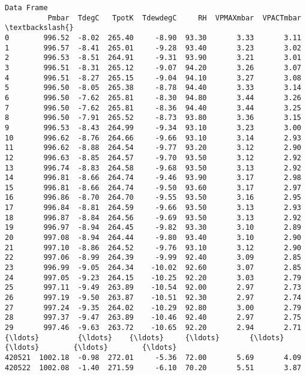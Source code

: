 \documentclass[11pt]{article}
\begin{document}
    \begin{Verbatim}[commandchars=\\\{\}]
Data Frame
          Pmbar  TdegC   TpotK  TdewdegC     RH  VPMAXmbar  VPACTmbar  \textbackslash{}
0        996.52  -8.02  265.40     -8.90  93.30       3.33       3.11   
1        996.57  -8.41  265.01     -9.28  93.40       3.23       3.02   
2        996.53  -8.51  264.91     -9.31  93.90       3.21       3.01   
3        996.51  -8.31  265.12     -9.07  94.20       3.26       3.07   
4        996.51  -8.27  265.15     -9.04  94.10       3.27       3.08   
5        996.50  -8.05  265.38     -8.78  94.40       3.33       3.14   
6        996.50  -7.62  265.81     -8.30  94.80       3.44       3.26   
7        996.50  -7.62  265.81     -8.36  94.40       3.44       3.25   
8        996.50  -7.91  265.52     -8.73  93.80       3.36       3.15   
9        996.53  -8.43  264.99     -9.34  93.10       3.23       3.00   
10       996.62  -8.76  264.66     -9.66  93.10       3.14       2.93   
11       996.62  -8.88  264.54     -9.77  93.20       3.12       2.90   
12       996.63  -8.85  264.57     -9.70  93.50       3.12       2.92   
13       996.74  -8.83  264.58     -9.68  93.50       3.13       2.92   
14       996.81  -8.66  264.74     -9.46  93.90       3.17       2.98   
15       996.81  -8.66  264.74     -9.50  93.60       3.17       2.97   
16       996.86  -8.70  264.70     -9.55  93.50       3.16       2.95   
17       996.84  -8.81  264.59     -9.66  93.50       3.13       2.93   
18       996.87  -8.84  264.56     -9.69  93.50       3.13       2.92   
19       996.97  -8.94  264.45     -9.82  93.30       3.10       2.89   
20       997.08  -8.94  264.44     -9.80  93.40       3.10       2.90   
21       997.10  -8.86  264.52     -9.76  93.10       3.12       2.90   
22       997.06  -8.99  264.39     -9.99  92.40       3.09       2.85   
23       996.99  -9.05  264.34    -10.02  92.60       3.07       2.85   
24       997.05  -9.23  264.15    -10.25  92.20       3.03       2.79   
25       997.11  -9.49  263.89    -10.54  92.00       2.97       2.73   
26       997.19  -9.50  263.87    -10.51  92.30       2.97       2.74   
27       997.24  -9.35  264.02    -10.29  92.80       3.00       2.79   
28       997.37  -9.47  263.89    -10.46  92.40       2.97       2.75   
29       997.46  -9.63  263.72    -10.65  92.20       2.94       2.71   
{\ldots}         {\ldots}    {\ldots}     {\ldots}       {\ldots}    {\ldots}        {\ldots}        {\ldots}   
420521  1002.18  -0.98  272.01     -5.36  72.00       5.69       4.09   
420522  1002.08  -1.40  271.59     -6.10  70.20       5.51       3.87   

\end{Verbatim}
\end{document}
